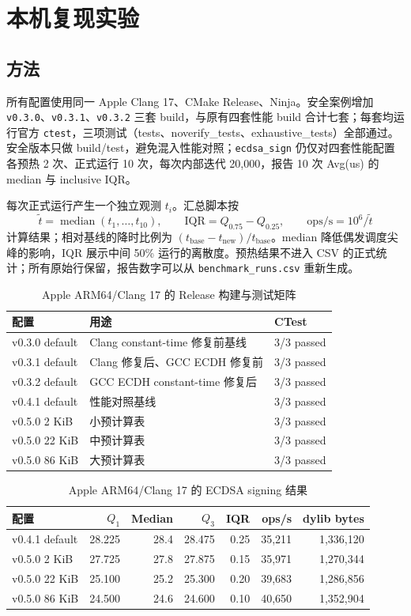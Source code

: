 \documentclass[11pt,a4paper,fontset=none]{ctexart}
\begin{document}
\section{本机复现实验}

\subsection{方法}

所有配置使用同一 Apple Clang 17、CMake Release、Ninja。安全案例增加 \texttt{v0.3.0}、\texttt{v0.3.1}、\texttt{v0.3.2} 三套 build，与原有四套性能 build 合计七套；每套均运行官方 \texttt{ctest}，三项测试（tests、noverify\_tests、exhaustive\_tests）全部通过。安全版本只做 build/test，避免混入性能对照；\texttt{ecdsa\_sign} 仍仅对四套性能配置各预热 2 次、正式运行 10 次，每次内部迭代 20,000，报告 10 次 Avg(us) 的 median 与 inclusive IQR。

每次正式运行产生一个独立观测 $t_i$。汇总脚本按
\[
\widetilde t=\operatorname{median}(t_1,\ldots,t_{10}),\qquad
\mathrm{IQR}=Q_{0.75}-Q_{0.25},\qquad
\mathrm{ops/s}=10^6/\widetilde t
\]
计算结果；相对基线的降时比例为 $(t_{\mathrm{base}}-t_{\mathrm{new}})/t_{\mathrm{base}}$。median 降低偶发调度尖峰的影响，IQR 展示中间 50\% 运行的离散度。预热结果不进入 CSV 的正式统计；所有原始行保留，报告数字可以从 \texttt{benchmark\_runs.csv} 重新生成。

\begin{table}[htbp]
\centering
\caption{Apple ARM64/Clang 17 的 Release 构建与测试矩阵}
\begin{tabular}{lll}
\toprule
配置 & 用途 & CTest \\
\midrule
v0.3.0 default & Clang constant-time 修复前基线 & 3/3 passed \\
v0.3.1 default & Clang 修复后、GCC ECDH 修复前 & 3/3 passed \\
v0.3.2 default & GCC ECDH constant-time 修复后 & 3/3 passed \\
v0.4.1 default & 性能对照基线 & 3/3 passed \\
v0.5.0 2 KiB & 小预计算表 & 3/3 passed \\
v0.5.0 22 KiB & 中预计算表 & 3/3 passed \\
v0.5.0 86 KiB & 大预计算表 & 3/3 passed \\
\bottomrule
\end{tabular}
\end{table}

\begin{table}[htbp]
\centering
\caption{Apple ARM64/Clang 17 的 ECDSA signing 结果}
\begin{tabular}{lrrrrrr}
\toprule
配置 & $Q_1$ & Median & $Q_3$ & IQR & ops/s & dylib bytes \\
\midrule
v0.4.1 default & 28.225 & 28.4 & 28.475 & 0.25 & 35,211 & 1,336,120 \\
v0.5.0 2 KiB & 27.725 & 27.8 & 27.875 & 0.15 & 35,971 & 1,270,344 \\
v0.5.0 22 KiB & 25.100 & 25.2 & 25.300 & 0.20 & 39,683 & 1,286,856 \\
v0.5.0 86 KiB & 24.500 & 24.6 & 24.600 & 0.10 & 40,650 & 1,352,904 \\
\bottomrule
\end{tabular}
\end{table}
\end{document}
